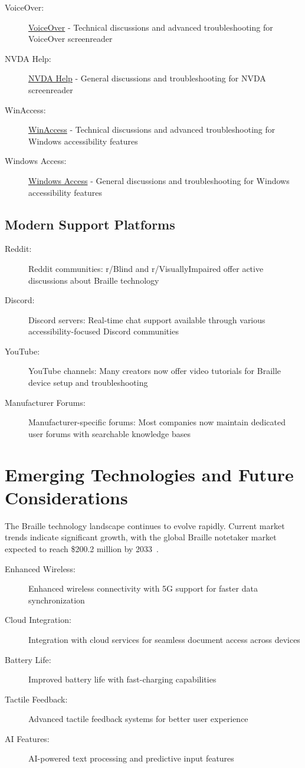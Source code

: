 \begin{description}
    \item[VoiceOver:] \href{https://groups.io/g/voiceover/messages}{VoiceOver} - Technical discussions and advanced troubleshooting for VoiceOver screenreader
    \item[NVDA Help:] \href{https://groups.io/g/NVDAhelp/messages}{NVDA Help} - General discussions and troubleshooting for NVDA screenreader
    \item[WinAccess:] \href{https://winaccess.groups.io/g/winaccess/messages}{WinAccess} - Technical discussions and advanced troubleshooting for Windows accessibility features
    \item[Windows Access:] \href{https://groups.io/g/windows-access/messages}{Windows Access} - General discussions and troubleshooting for Windows accessibility features
\end{description}

\subsection{Modern Support Platforms}
\label{modern-support}
\begin{description}
    \item[Reddit:] Reddit communities: r/Blind and r/VisuallyImpaired offer active discussions about Braille technology
    \item[Discord:] Discord servers: Real-time chat support available through various accessibility-focused Discord communities
    \item[YouTube:] YouTube channels: Many creators now offer video tutorials for Braille device setup and troubleshooting
    \item[Manufacturer Forums:] Manufacturer-specific forums: Most companies now maintain dedicated user forums with searchable knowledge bases
\end{description}

\section{Emerging Technologies and Future Considerations}
\label{emerging}
The Braille technology landscape continues to evolve rapidly. Current market trends indicate significant growth, with the global Braille notetaker market expected to reach \$200.2 million by 2033~\cite{BrailleMarketResearch}.

\begin{description}
    \item[Enhanced Wireless:] Enhanced wireless connectivity with 5G support for faster data synchronization
    \item[Cloud Integration:] Integration with cloud services for seamless document access across devices
    \item[Battery Life:] Improved battery life with fast-charging capabilities
    \item[Tactile Feedback:] Advanced tactile feedback systems for better user experience
    \item[AI Features:] AI-powered text processing and predictive input features
\end{description}


